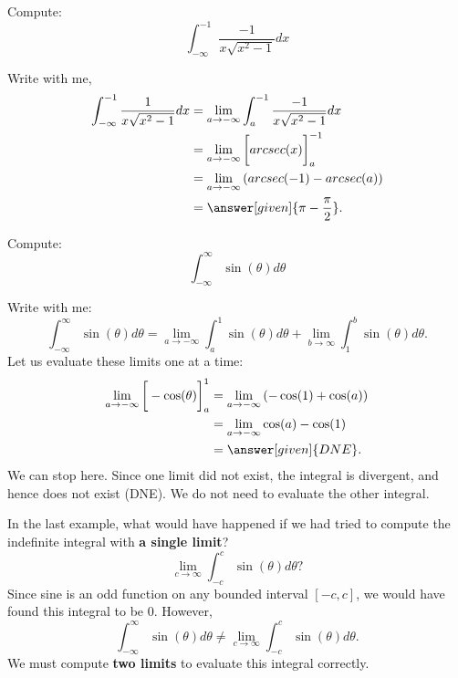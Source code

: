 \documentclass{ximera}
\begin{document}
\begin{example}	
  Compute:
  \[
  \int_{-\infty}^{-1}\frac{-1}{x\sqrt{x^2-1}} dx
  \]
  \begin{explanation}
    Write with me,
    \begin{align*}
      \int_{-\infty}^{-1} \frac{1}{x\sqrt{x^2-1}} dx &= \lim_{a \to -\infty} \int_{a}^{-1} \frac{-1}{x\sqrt{x^2-1}}dx\\
      &= \lim_{a \to -\infty} \bigg[arcsec(x)\bigg]_{a}^{-1} \\
      &= \lim_{a \to -\infty} \left(arcsec(-1) - arcsec(a)\right)\\
      &= \answer[given]{\pi - \frac{\pi}{2}}.
    \end{align*}
  \end{explanation}
  \end{example}

\begin{example}	
  Compute:
  \[
  \int_{-\infty}^\infty \sin(\theta) d\theta
  \]
  \begin{explanation}
    Write with me:
    \[
    \int_{-\infty}^\infty \sin(\theta) d\theta = \lim_{a\to -\infty} \int_a^1 \sin(\theta) d\theta + \lim_{b\to\infty}\int_1^b \sin(\theta) d\theta.
    \]
    Let us evaluate these limits one at a time:
    \begin{align*}  
      \lim_{a\to -\infty}\bigg[-\cos(\theta)\bigg]_a^1 &= \lim_{a\to -\infty}\left(-\cos(1)+\cos(a)\right)\\
      &= \lim_{a\to -\infty} \cos(a) -\cos(1)\\
      &= \answer[given]{DNE}.
    \end{align*}
    We can stop here. Since one limit did not exist, the integral is
    divergent, and hence does not exist (DNE). We do not need to evaluate the other integral.
  \end{explanation}
\end{example}


\begin{warning}
In the last example, what would have happened if we had tried to
compute the indefinite integral with \textbf{a single limit}?
\[
\lim_{c\to \infty}\int_{-c}^c \sin(\theta)d\theta?
\]
Since sine is an odd function on any bounded interval $[-c,c]$, we
would have found this integral to be $0$. However,
\[
\int_{-\infty}^\infty \sin(\theta) d\theta \ne \lim_{c\to \infty}\int_{-c}^c \sin(\theta)d\theta.
\]
We must compute \textbf{two limits} to evaluate this
integral correctly.

\end{warning}
\end{document}
